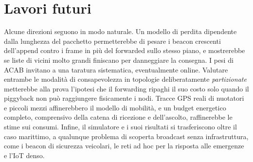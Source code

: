 \section{Lavori futuri}
\label{sec:concl-futuro}
Alcune direzioni seguono in modo naturale. Un modello di perdita dipendente dalla
lunghezza del pacchetto permetterebbe di pesare i beacon crescenti dell'append
contro i frame in pi\`u del forwarded sullo stesso piano, e mostrerebbe se liste
di vicini molto grandi finiscano per danneggiare la consegna. I pesi di ACAB
invitano a una taratura sistematica, eventualmente online. Valutare entrambe le
modalit\`a di consapevolezza in topologie deliberatamente \emph{partizionate}
metterebbe alla prova l'ipotesi che il forwarding ripaghi il suo costo solo
quando il piggyback non pu\`o raggiungere fisicamente i nodi. Tracce GPS reali di
nuotatori e piccoli mezzi affinerebbero il modello di mobilit\`a, e un budget
energetico completo, comprensivo della catena di ricezione e dell'ascolto,
raffinerebbe le stime sui consumi. Infine, il simulatore e i suoi risultati si
trasferiscono oltre il caso marittimo, a qualunque problema di scoperta broadcast
senza infrastruttura, come i beacon di sicurezza veicolari, le reti ad hoc per la
risposta alle emergenze e l'IoT denso.


